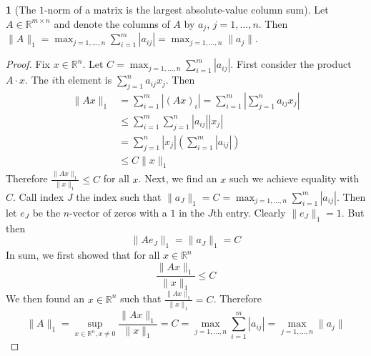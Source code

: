 \documentclass[12pt]{article}
\theoremstyle{definition}
\newcommand{\R}{\mathbb{R}}
\newcommand{\norm}[1]{\lVert#1\rVert}
\newtheorem{theorem}{\color{ForestGreen}{\textbf{Theorem}}}
\theoremstyle{definition}
\begin{document}
\begin{theorem}[The $1$-norm of a matrix is the largest absolute-value column sum]
Let $A \in \R^{m \times n }$ and denote the columns of $A$ by $a_j$, $j=1, \ldots, n$. Then $\norm{A}_1 = \max_{j=1, \ldots, n} \sum_{i=1}^{m} |a_{ij}| =  \max_{j=1, \ldots, n} \norm{a_j}$.
\end{theorem}
\begin{proof}
Fix $x \in \R^n$. Let $C = \max_{j=1, \ldots, n} \sum_{i=1}^{m} |a_{ij}|$. First consider the product $A\cdot x$. The $i$th element is $\sum_{j=1}^n a_{ij} x_j$. Then
\begin{align*}
	\norm{Ax}_1 &= \sum_{i=1}^m |(Ax)_i | = \sum_{i=1}^m |\sum_{j=1}^n a_{ij} x_j| \\
	&\leq \sum_{i=1}^m \sum_{j=1}^n |a_{ij}| |x_j| \tag{triangle inequality} \\
	&= \sum_{j=1}^n |x_j| \left(\sum_{i=1}^m |a_{ij}| \right) \tag{interchange order of summation, assumed finite} \\
	&\leq C \norm{x}_1
\end{align*}
Therefore $\frac{\norm{Ax}_1}{\norm{x}_1} \leq C$ for all $x$. Next, we find an $x$ such we achieve equality with $C$. Call index $J$ the index such that $\norm{a_J}_1 = C = \max_{j=1, \ldots, n} \sum_{i=1}^{m} |a_{ij}|$. Then let $e_J$ be the $n$-vector of zeros with a $1$ in the $J$th entry. Clearly $\norm{e_J}_1 = 1$. But then
\begin{equation}
 	\norm{A e_J}_1 = \norm{a_J}_1 = C
\end{equation} 
In sum, we first showed that for all $x \in \R^n$
\begin{equation}
	\frac{\norm{Ax}_1}{\norm{x}_1} \leq C
\end{equation}
We then found an $x \in \R^n$ such that $\frac{\norm{Ax}_1}{\norm{x}_1} = C$. Therefore 
\begin{equation}
	\norm{A}_1 = \sup_{x \in \R^n, x\neq 0} \frac{\norm{Ax}_1}{\norm{x}_1} = C = \max_{j=1, \ldots, n} \sum_{i=1}^{m} |a_{ij}| =  \max_{j=1, \ldots, n} \norm{a_j}
\end{equation}
\end{proof}
\end{document}
